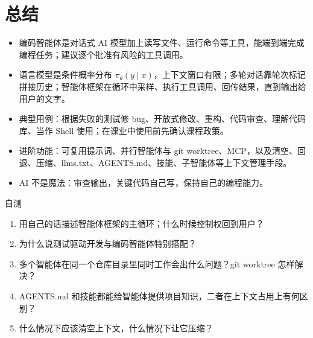 \documentclass[a4paper]{article}
\begin{document}
\section{总结}

\begin{itemize}
\item 编码智能体是对话式 AI 模型加上读写文件、运行命令等工具，能端到端完成编程任务；建议逐个批准有风险的工具调用。
\item 语言模型是条件概率分布 $\pi_\theta(y \mid x)$，上下文窗口有限；多轮对话靠轮次标记拼接历史；智能体框架在循环中采样、执行工具调用、回传结果，直到输出给用户的文字。
\item 典型用例：根据失败的测试修 bug、开放式修改、重构、代码审查、理解代码库、当作 Shell 使用；在课业中使用前先确认课程政策。
\item 进阶功能：可复用提示词、并行智能体与 git worktree、MCP，以及清空、回退、压缩、llms.txt、AGENTS.md、技能、子智能体等上下文管理手段。
\item AI 不是魔法：审查输出，关键代码自己写，保持自己的编程能力。
\end{itemize}

\begin{practicebox}{自测}
\begin{enumerate}
\item 用自己的话描述智能体框架的主循环；什么时候控制权回到用户？
\item 为什么说测试驱动开发与编码智能体特别搭配？
\item 多个智能体在同一个仓库目录里同时工作会出什么问题？git worktree 怎样解决？
\item AGENTS.md 和技能都能给智能体提供项目知识，二者在上下文占用上有何区别？
\item 什么情况下应该清空上下文，什么情况下让它压缩？
\end{enumerate}
\end{practicebox}
\end{document}
